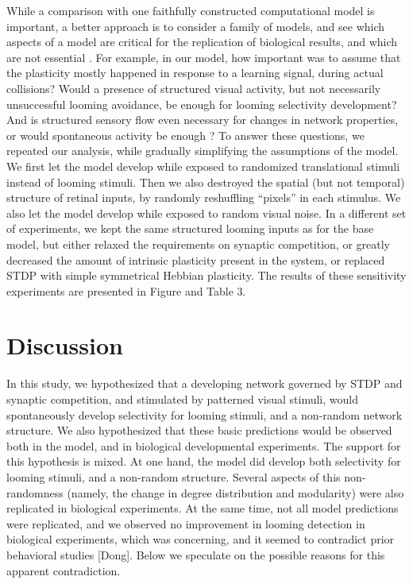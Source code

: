 \documentclass{article}
\begin{document}
While a comparison with one faithfully constructed computational model is important, a better approach is to consider a family of models, and see which aspects of a model are critical for the replication of biological results, and which are not essential \citep{linderman2017constrain,pauli2018repro}. For example, in our model, how important was to assume that the plasticity mostly happened in response to a learning signal, during actual collisions? Would a presence of structured visual activity, but not necessarily unsuccessful looming avoidance, be enough for looming selectivity development? And is structured sensory flow even necessary for changes in network properties, or would spontaneous activity be enough \citep{triplett2018emergence}? To answer these questions, we repeated our analysis, while gradually simplifying the assumptions of the model. We first let the model develop while exposed to randomized translational stimuli instead of looming stimuli. Then we also destroyed the spatial (but not temporal) structure of retinal inputs, by randomly reshuffling “pixels” in each stimulus. We also let the model develop while exposed to random visual noise. In a different set of experiments, we kept the same structured looming inputs as for the base model, but either relaxed the requirements on synaptic competition, or greatly decreased the amount of intrinsic plasticity present in the system, or replaced STDP with simple symmetrical Hebbian plasticity. The results of these sensitivity experiments are presented in Figure and Table 3.

\section*{Discussion}

In this study, we hypothesized that a developing network governed by STDP and synaptic competition, and stimulated by patterned visual stimuli, would spontaneously develop selectivity for looming stimuli, and a non-random network structure. We also hypothesized that these basic predictions would be observed both in the model, and in biological developmental experiments. The support for this hypothesis is mixed. At one hand, the model did develop both selectivity for looming stimuli, and a non-random structure. Several aspects of this non-randomness (namely, the change in degree distribution and modularity) were also replicated in biological experiments. At the same time, not all model predictions were replicated, and we observed no improvement in looming detection in biological experiments, which was concerning, and it seemed to contradict prior behavioral studies [Dong]. Below we speculate on the possible reasons for this apparent contradiction.
\end{document}
